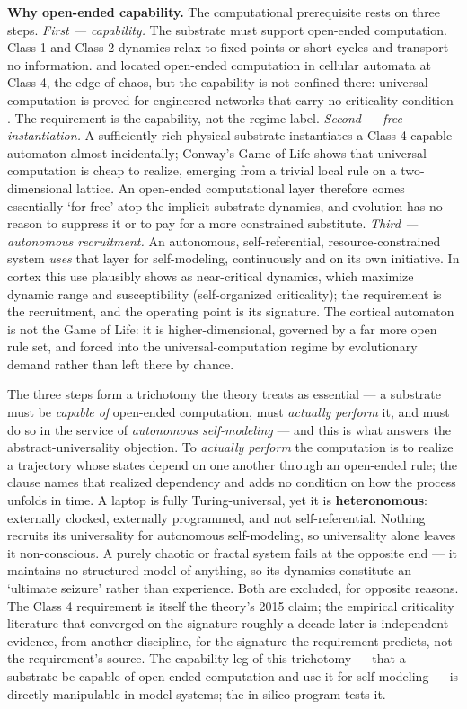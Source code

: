 \documentclass[12pt]{article}
\newcommand{\revstart}{}
\newcommand{\revend}{}
\begin{document}
{\revstart\textbf{Why open-ended capability.} The computational prerequisite rests on three steps. \emph{First --- capability.} The substrate must support open-ended computation. Class 1 and Class 2 dynamics relax to fixed points or short cycles and transport no information. \citet{Langton1990} and \citet{Wolfram2002} located open-ended computation in cellular automata at Class 4, the edge of chaos, but the capability is not confined there: universal computation is proved for engineered networks that carry no criticality condition \citep{SiegelmannSontag1995,Maass1996}. The requirement is the capability, not the regime label. \emph{Second --- free instantiation.} A sufficiently rich physical substrate instantiates a Class 4-capable automaton almost incidentally; Conway's Game of Life shows that universal computation is cheap to realize, emerging from a trivial local rule on a two-dimensional lattice. An open-ended computational layer therefore comes essentially `for free' atop the implicit substrate dynamics, and evolution has no reason to suppress it or to pay for a more constrained substitute. \emph{Third --- autonomous recruitment.} An autonomous, self-referential, resource-constrained system \emph{uses} that layer for self-modeling, continuously and on its own initiative. In cortex this use plausibly shows as near-critical dynamics, which maximize dynamic range and susceptibility (self-organized criticality); the requirement is the recruitment, and the operating point is its signature. The cortical automaton is not the Game of Life: it is higher-dimensional, governed by a far more open rule set, and forced into the universal-computation regime by evolutionary demand rather than left there by chance.\revend}

{\revstart The three steps form a trichotomy the theory treats as essential --- a substrate must be \emph{capable of} open-ended computation, must \emph{actually perform} it, and must do so in the service of \emph{autonomous self-modeling} --- and this is what answers the abstract-universality objection. To \emph{actually perform} the computation is to realize a trajectory whose states depend on one another through an open-ended rule; the clause names that realized dependency and adds no condition on how the process unfolds in time. A laptop is fully Turing-universal, yet it is \textbf{heteronomous}: externally clocked, externally programmed, and not self-referential. Nothing recruits its universality for autonomous self-modeling, so universality alone leaves it non-conscious. A purely chaotic or fractal system fails at the opposite end --- it maintains no structured model of anything, so its dynamics constitute an `ultimate seizure' rather than experience. Both are excluded, for opposite reasons. The Class 4 requirement is itself the theory's 2015 claim; the empirical criticality literature that converged on the signature roughly a decade later \citep{HengenShew2025,AlgomShriki2026,Toker2026} is independent evidence, from another discipline, for the signature the requirement predicts, not the requirement's source. The capability leg of this trichotomy --- that a substrate be capable of open-ended computation and use it for self-modeling --- is directly manipulable in model systems; the in-silico program tests it.\revend}
\end{document}
